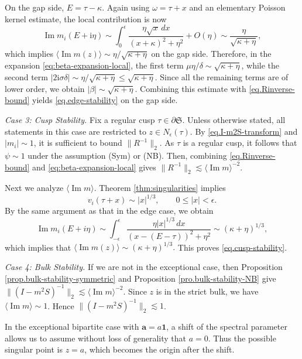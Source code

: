 \documentclass[11pt,twoside, a4paper]{article}
\numberwithin{equation}{section}
\numberwithin{figure}{section}
\theoremstyle{plain} %
\theoremstyle{definition}
\theoremstyle{remark}
\newcommand{\1} {\mspace{1 mu}}
\newcommand{\2} {\mspace{2 mu}}
\newcommand{\ii}{\mathrm{i}}
\DeclareMathOperator{\im}{Im}
\begin{document}
On the gap side, \(E=\tau-\kappa\). Again using
\(\omega=\tau+ x\) and an elementary Poisson kernel estimate, the local contribution is now
\[
    \im m_i(E+\ii\eta)
    \sim
    \int_0^\epsilon
    \frac{\eta \sqrt{x}\,dx}{(x+\kappa)^2+\eta^2}+O(\eta)\sim \frac{\eta}{\sqrt{\kappa+\eta}},
\]
which implies
$
    \langle \im m(z)\rangle
    \sim
    \eta/\sqrt{\kappa+\eta}
$
on the gap side. 
Therefore, in the expansion \eqref{eq:beta-expansion-local}, 
the first term $\mu\eta/\delta \sim \sqrt{\kappa+\eta}$, while the second term $|2\mathrm i\sigma\delta|\sim \eta/\sqrt{\kappa+\eta}\le\sqrt{\kappa+\eta}$.
Since all the remaining terms are of lower order, we obtain $|\beta|\sim\sqrt{\kappa+\eta}$.
Combining this estimate with \eqref{eq.Rinverse-bound} yields \eqref{eq.edge-stability} on the gap side.




\medskip
\textit{Case 3: Cusp Stability.} Fix a regular cusp $\tau\in\partial\mathfrak{S}$. Unless otherwise stated, all statements in this case are restricted to $z\in N_\epsilon(\tau)$.
By \eqref{eq.I-m2S-transform} and $|m_i|\sim 1$, it is sufficient to bound $\|R^{-1}\|_2$. As $\tau$ is a regular cusp, it follows that $\psi\sim 1$ under the assumption (Sym) or (NB).  
Then, combining \eqref{eq.Rinverse-bound} and \eqref{eq:beta-expansion-local} gives $\|R^{-1}\|_2\lesssim \langle\im m\rangle^{-2}$. 

Next we analyze $\langle \im m\rangle$. Theorem \ref{thm:singularities} implies 
\[
    v_i(\tau+x)\sim |x|^{1/3},\qquad 0\le|x|<\epsilon.
\]
By the same argument as that in the edge case, we obtain
\[
    \im m_i(E+i\eta)
    \sim
    \int_{-\epsilon}^{\epsilon}
    \frac{\eta |x|^{1/3}\,dx}{(x-(E-\tau))^2+\eta^2}
    \sim
    (\kappa+\eta)^{1/3},
\]
which implies that
$
    \langle \im m(z)\rangle
    \sim
    (\kappa+\eta)^{1/3}.
$
This proves \eqref{eq.cusp-stability}.

\medskip
\textit{Case 4: Bulk Stability.}
If we are not in the exceptional case, then Proposition \ref{prop.bulk-stability-symmetric} and Proposition \ref{pro.bulk-stability-NB} give $\|(I-m^2S)^{-1}\|_2\lesssim\langle\im m\rangle^{-2}$. Since $z$ is in the strict bulk, we have $\langle \im m\rangle\sim 1$. 
Hence $\|(I-m^2S)^{-1}\|_2\lesssim 1$. 

    


In the exceptional bipartite case with \(\mathbf a=a\mathbf 1\), a shift of the spectral parameter allows us to assume without loss of generality that \(a=0\). Thus the possible singular point is \(z=a\), which becomes the origin after the shift.
\end{document}
